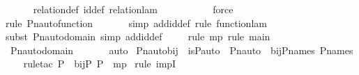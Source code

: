 \begin{isabellebody}
\ \ \ \ \isamarkupfalse%
\ relation{\isacharunderscore}{\kern0pt}def\ id{\isacharunderscore}{\kern0pt}def\ relation{\isacharunderscore}{\kern0pt}lam\ \isanewline
\ \ \ \ \ \ \ \ \isamarkupfalse%
\ force\isanewline
\ \ \ \ \ \ \ \isamarkupfalse%
{\isacharparenleft}{\kern0pt}rule\ Pn{\isacharunderscore}{\kern0pt}auto{\isacharunderscore}{\kern0pt}function{\isacharparenright}{\kern0pt}\isanewline
\ \ \ \ \ \ \isamarkupfalse%
{\isacharparenleft}{\kern0pt}simp\ add{\isacharcolon}{\kern0pt}id{\isacharunderscore}{\kern0pt}def{\isacharcomma}{\kern0pt}\ rule\ function{\isacharunderscore}{\kern0pt}lam{\isacharparenright}{\kern0pt}\isanewline
\ \ \ \ \ \isamarkupfalse%
{\isacharparenleft}{\kern0pt}subst\ Pn{\isacharunderscore}{\kern0pt}auto{\isacharunderscore}{\kern0pt}domain{\isacharcomma}{\kern0pt}\ simp\ add{\isacharcolon}{\kern0pt}id{\isacharunderscore}{\kern0pt}def{\isacharparenright}{\kern0pt}\isanewline
\ \ \ \ \isamarkupfalse%
{\isacharparenleft}{\kern0pt}rule\ mp{\isacharcomma}{\kern0pt}\ rule\ main{\isacharparenright}{\kern0pt}\isanewline
\ \ \ \ \isamarkupfalse%
\ Pn{\isacharunderscore}{\kern0pt}auto{\isacharunderscore}{\kern0pt}domain\ \isanewline
\ \ \ \ \isamarkupfalse%
\ auto\isanewline
{}\isamarkupfalse%
%
\endisatagproof
{\isafoldproof}%
%
\isadelimproof
\isanewline
%
\endisadelimproof
\isanewline
{}\isamarkupfalse%
\ Pn{\isacharunderscore}{\kern0pt}auto{\isacharunderscore}{\kern0pt}bij\ {\isacharcolon}{\kern0pt}\ {\isachardoublequoteopen}is{\isacharunderscore}{\kern0pt}P{\isacharunderscore}{\kern0pt}auto{\isacharparenleft}{\kern0pt}{\isasympi}{\isacharparenright}{\kern0pt}\ {\isasymLongrightarrow}\ Pn{\isacharunderscore}{\kern0pt}auto{\isacharparenleft}{\kern0pt}{\isasympi}{\isacharparenright}{\kern0pt}\ {\isasymin}\ bij{\isacharparenleft}{\kern0pt}P{\isacharunderscore}{\kern0pt}names{\isacharcomma}{\kern0pt}\ P{\isacharunderscore}{\kern0pt}names{\isacharparenright}{\kern0pt}{\isachardoublequoteclose}\isanewline
%
\isadelimproof
\ \ %
\endisadelimproof
%
\isatagproof
{}\isamarkupfalse%
\ {\isacharparenleft}{\kern0pt}rule{\isacharunderscore}{\kern0pt}tac\ P{\isacharequal}{\kern0pt}{\isachardoublequoteopen}{\isasympi}\ {\isasymin}\ bij{\isacharparenleft}{\kern0pt}P{\isacharcomma}{\kern0pt}\ P{\isacharparenright}{\kern0pt}{\isachardoublequoteclose}\ \ mp{\isacharparenright}{\kern0pt}\ \isamarkupfalse%
{\isacharparenleft}{\kern0pt}rule\ impI{\isacharparenright}{\kern0pt}\isanewline

\end{isabellebody}
